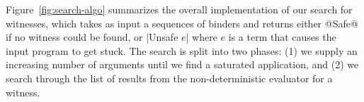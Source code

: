%
Figure~\ref{fig:search-algo} summarizes the overall implementation of
our search for witnesses, which takes as input a sequences of binders
and returns either @Safe@ if no witness could be found, or |Unsafe $e$|
where $e$ is a term that causes the input program to get stuck.
%
The search is split into two phases: (1) we supply an increasing number
of arguments until we find a saturated application, and (2) we search
through the list of results from the non-deterministic evaluator for a
witness.



